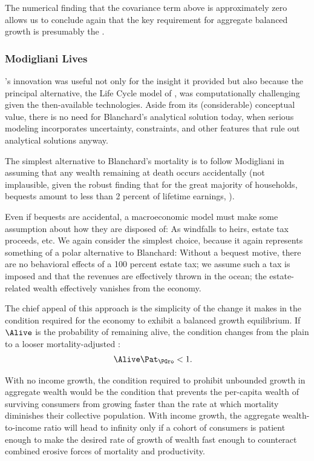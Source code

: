 \documentclass[BufferStockTheory]{subfiles}
\begin{document}
The numerical finding that the covariance term above is approximately zero allows us to conclude again that the key requirement for aggregate balanced growth is presumably the {\GICAbs}.

\hypertarget{Modigliani-Lives}{}
\subsubsection{Modigliani Lives}

\cite{blanchardFinite}'s innovation was useful not only for the insight it provided but also because the principal alternative, the Life Cycle model of \cite{modiglianiWealth}, was computationally challenging given the then-available technologies. Aside from its (considerable) conceptual value, there is no need for Blanchard's analytical solution today, when serious modeling incorporates uncertainty, constraints, and other features that rule out analytical solutions anyway.  %

The simplest alternative to Blanchard's mortality is to follow Modigliani in assuming that any wealth remaining at death occurs accidentally (not implausible, given the robust finding that for the great majority of households, bequests amount to less than 2 percent of lifetime earnings, \cite{hendricksBequests,hendricksSmallBequests}).

Even if bequests are accidental, a macroeconomic model must make some assumption about how they are disposed of: As windfalls to heirs, estate tax proceeds, etc. We again consider the simplest choice, because it again represents something of a polar alternative to Blanchard: Without a bequest motive, there are no behavioral effects of a 100 percent estate tax; we assume such a tax is imposed and that the revenues are effectively thrown in the ocean; the estate-related wealth effectively vanishes from the economy.

The chief appeal of this approach is the simplicity of the change it makes in the condition required for the economy to exhibit a balanced growth equilibrium.  If $\Alive$ is the probability of remaining alive, the condition changes from the plain {\GIC} to a looser mortality-adjusted {\GIC}:
\hypertarget{GICMrt}{}
\begin{align}
  \Alive  \Pat_{\PGro} & < 1. \label{eq:GICMrt}
\end{align}

With no income growth, the condition required to prohibit unbounded growth in aggregate wealth would be the condition that prevents the per-capita wealth of surviving consumers from growing faster than the rate at which mortality diminishes their collective population.  With income growth, the aggregate wealth-to-income ratio will head to infinity only if a cohort of consumers is patient enough to make the desired rate of growth of wealth fast enough to counteract combined erosive forces of mortality and productivity.
\end{document}
